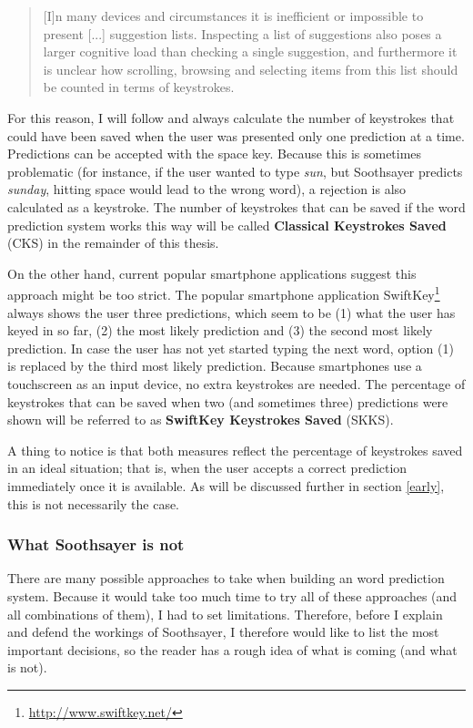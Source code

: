 \documentclass[12pt]{article}
\begin{document}
\begin{quotation}
[I]n many devices and circumstances it is inefficient or impossible to present [...] suggestion lists. Inspecting a list of suggestions also poses a larger cognitive load than checking a single suggestion, and furthermore it is unclear how scrolling, browsing and selecting items from this list should be counted in terms of keystrokes.
\end{quotation}

For this reason, I will follow  and always calculate the number of keystrokes that could have been saved when the user was presented only one prediction at a time. Predictions can be accepted with the space key. Because this is sometimes problematic (for instance, if the user wanted to type \emph{sun}, but Soothsayer predicts \emph{sunday}, hitting space would lead to the wrong word), a rejection is also calculated as a keystroke. The number of keystrokes that can be saved if the word prediction system works this way will be called \textbf{Classical Keystrokes Saved} (CKS) in the remainder of this thesis.

On the other hand, current popular smartphone applications suggest this approach might be too strict. The popular smartphone application SwiftKey\footnote{\url{http://www.swiftkey.net/}} always shows the user three predictions, which seem to be (1) what the user has keyed in so far, (2) the most likely prediction and (3) the second most likely prediction. In case the user has not yet started typing the next word, option (1) is replaced by the third most likely prediction. Because smartphones use a touchscreen as an input device, no extra keystrokes are needed. The percentage of keystrokes that can be saved when two (and sometimes three) predictions were shown will be referred to as \textbf{SwiftKey Keystrokes Saved} (SKKS).

A thing to notice is that both measures reflect the percentage of keystrokes saved in an ideal situation; that is, when the user accepts a correct prediction immediately once it is available. As will be discussed further in section \ref{early}, this is not necessarily the case. 


\subsubsection{What Soothsayer is not}
There are many possible approaches to take when building an word prediction system. Because it would take too much time to try all of these approaches (and all combinations of them), I had to set limitations. Therefore, before I explain and defend the workings of Soothsayer, I therefore would like to list the most important decisions, so the reader has a rough idea of what is coming (and what is not). 
\end{document}
